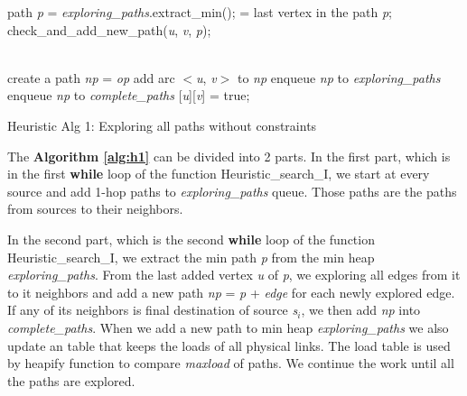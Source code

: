 \begin{algorithm}[!htp]
\begin{algorithmic}
	\State path \textit{p} = \textit{exploring\_paths}.extract\_min();
	 = last vertex in the path {\it p};
	    \State check\_and\_add\_new\_path({\it u}, \textit{v}, {\it p});
	\EndFor
    \EndWhile

    \EndFunction
\\
	    \State create a path \textit{np} = {\it op}
	    \State add arc $<$\textit{u}, \textit{v}$>$ to \textit{np}
	    \State enqueue \textit{np} to \textit{exploring\_paths}
	        \State enqueue \textit{np} to \textit{complete\_paths}
            \EndIf
	    [\textit{u}][\textit{v}] = true;
	\EndIf
    \EndFunction
\end{algorithmic}

\caption{Heuristic Alg 1: Exploring all paths without constraints}
\label{alg:h1}

\end{algorithm}

The \textbf{Algorithm \ref{alg:h1}} can be divided into 2 parts. In the first part, which is in the first \textbf{while} loop of the function Heuristic\_search\_I, we start at every source and add 1-hop paths to \textit{exploring\_paths} queue. Those paths are the paths from sources to their neighbors. 

In the second part, which is the second \textbf{while} loop of the function Heuristic\_search\_I, we extract the min path \textit{p} from the min heap \textit{exploring\_paths}. From the last added vertex \textit{u} of \textit{p}, we exploring all edges from it to it neighbors and add a new path \textit{np} = \textit{p} + \textit{edge} for each newly explored edge. If any of its neighbors is final destination of source \textit{s$_i$}, we then add \textit{np} into \textit{complete\_paths}. When we add a new path to min heap \textit{exploring\_paths} we also update an table that keeps the loads of all physical links. The load table is used by heapify function to compare \textit{maxload} of paths. We continue the work until all the paths are explored.

